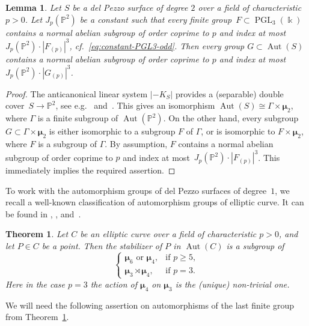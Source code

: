 \documentclass[12pt]{amsart}
\numberwithin{equation}{section}
\newtheorem{lemma}[subsection]{Lemma}
\newtheorem{theorem}[subsection]{Theorem}
\theoremstyle{definition}
\newcommand{\mumu}{\boldsymbol{\mu}}
\newcommand{\PP}{\mathbb P}
\DeclareMathOperator{\Aut}{Aut}
\DeclareMathOperator{\PGL}{PGL}
\def \ge {\geqslant}
\begin{document}
\begin{lemma}\label{lemma:dP2}
Let $S$ be a del Pezzo surface of degree $2$ over a field
of characteristic $p>0$.
Let $J_p(\PP^2)$ be a constant such that every finite group~\mbox{$F\subset\PGL_3(\Bbbk)$}
contains a normal abelian subgroup of order
coprime to $p$ and index at most~\mbox{$J_p(\PP^2)\cdot |F_{(p)}|^3$},
cf.~\eqref{eq:constant-PGL3-odd}.
Then every group $G\subset\Aut(S)$ contains a normal abelian subgroup of order
coprime to $p$
and index at most $J_p(\PP^2)\cdot |G_{(p)}|^3$.
\end{lemma}

\begin{proof}
The anticanonical linear system $|-K_S|$ provides a (separable) double cover~\mbox{$S\to\PP^2$},
see e.g.~\mbox{\cite[Proposition~3.1]{DM-2}} and~\mbox{\cite[\S2.1]{DM-odd}}.
This gives an isomorphism $\Aut(S)\cong\Gamma\times \mumu_2$, where $\Gamma$ is a finite
subgroup of $\Aut(\PP^2)$.
On the other hand, every subgroup $G\subset\Gamma\times\mumu_2$ is either isomorphic to
a subgroup $F$ of $\Gamma$, or is isomorphic to $F\times\mumu_2$, where $F$ is a subgroup of $\Gamma$.
By assumption, $F$
contains a normal abelian subgroup of order
coprime to $p$ and index
at most~\mbox{$J_p(\PP^2)\cdot |F_{(p)}|^3$}.
This immediately implies the required assertion.
\end{proof}

To work with the automorphism groups of del Pezzo surfaces of degree~$1$,
we recall a well-known classification of automorphism groups
of elliptic curve. It can be found in
\cite[Corollary~III.10.2]{Silverman}, \cite[Proposition~A.1.2(c)]{Silverman},
and~\mbox{\cite[Exercise A.1]{Silverman}}.

\begin{theorem}
\label{theorem:elliptic}
Let $C$ be an elliptic curve over a field
of characteristic $p>0$, and let $P\in C$ be a point. Then the stabilizer
of $P$ in $\Aut(C)$ is a subgroup of
\begin{equation}\label{eq:dP1-groups}
\begin{cases}
\mumu_6 \text{\ or\ } \mumu_4, &\text{if\ } p\ge 5,\\
\mumu_3\rtimes\mumu_4, &\text{if\ } p=3.
\end{cases}
\end{equation}
Here in the case $p=3$ the action of $\mumu_4$ on $\mumu_3$ is the (unique) non-trivial one.
\end{theorem}

We will need the following assertion on automorphisms of the last finite group
from Theorem~\ref{theorem:elliptic}.
\end{document}
